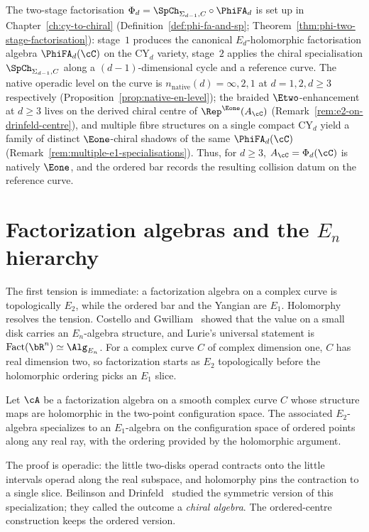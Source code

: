 The two-stage factorisation $\Phi_d = \SpCh_{\Sigma_{d-1}, C} \circ \PhiFA_d$ is set up in Chapter~\ref{ch:cy-to-chiral} (Definition~\ref{def:phi-fa-and-sp}; Theorem~\ref{thm:phi-two-stage-factorisation}): stage~$1$ produces the canonical $E_d$-holomorphic factorisation algebra $\PhiFA_d(\cC)$ on the CY$_d$ variety, stage~$2$ applies the chiral specialisation $\SpCh_{\Sigma_{d-1}, C}$ along a $(d - 1)$-dimensional cycle and a reference curve. The native operadic level on the curve is $n_{\mathrm{native}}(d) = \infty, 2, 1$ at $d = 1, 2, d \geq 3$ respectively (Proposition~\ref{prop:native-en-level}); the braided $\Etwo$-enhancement at $d \geq 3$ lives on the derived chiral centre of $\Rep^{\Eone}(A_\cC)$ (Remark~\ref{rem:e2-on-drinfeld-centre}), and multiple fibre structures on a single compact CY$_d$ yield a family of distinct $\Eone$-chiral shadows of the same $\PhiFA_d(\cC)$ (Remark~\ref{rem:multiple-e1-specialisations}). Thus, for $d \geq 3$, $A_\cC = \Phi_d(\cC)$ is natively $\Eone$, and the ordered bar records the resulting collision datum on the reference curve.

\section{Factorization algebras and the \texorpdfstring{$E_n$}{E-n} hierarchy}
\label{sec:factorization-en}

The first tension is immediate: a factorization algebra on a complex curve is topologically $E_2$, while the ordered bar and the Yangian are $E_1$. Holomorphy resolves the tension. Costello and Gwilliam~\cite{CostelloGwilliam} showed that the value on a small disk carries an $E_n$-algebra structure, and Lurie's universal statement is $\mathrm{Fact}(\bR^n) \simeq \Alg_{E_n}$. For a complex curve $C$ of complex dimension one, $C$ has real dimension two, so factorization starts as $E_2$ topologically before the holomorphic ordering picks an $E_1$ slice.

\begin{proposition}
\label{prop:holomorphic-e1}
Let $\cA$ be a factorization algebra on a smooth complex curve $C$ whose structure maps are holomorphic in the two-point configuration space. The associated $E_2$-algebra specializes to an $E_1$-algebra on the configuration space of ordered points along any real ray, with the ordering provided by the holomorphic argument.
\end{proposition}

The proof is operadic: the little two-disks operad contracts onto the little intervals operad along the real subspace, and holomorphy pins the contraction to a single slice. Beilinson and Drinfeld~\cite{BeilinsonDrinfeld} studied the symmetric version of this specialization; they called the outcome a \emph{chiral algebra}. The ordered-centre construction keeps the ordered version.

